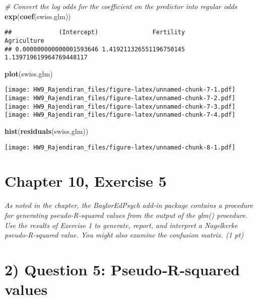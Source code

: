 \documentclass[]{article}
\newenvironment{Shaded}{\begin{snugshade}}{\end{snugshade}}
\newcommand{\CommentTok}[1]{\textcolor[rgb]{0.56,0.35,0.01}{\textit{#1}}}
\newcommand{\KeywordTok}[1]{\textcolor[rgb]{0.13,0.29,0.53}{\textbf{#1}}}
\newcommand{\NormalTok}[1]{#1}
\begin{document}
\begin{Shaded}
\begin{Highlighting}[]
\CommentTok{# Convert the log odds for the coefficient on the predictor into regular odds}
\KeywordTok{exp}\NormalTok{(}\KeywordTok{coef}\NormalTok{(swiss.glm))}
\end{Highlighting}
\end{Shaded}

\begin{verbatim}
##             (Intercept)               Fertility             Agriculture 
## 0.000000000000001593646 1.419211326551196750145 1.139719619964769448117
\end{verbatim}

\begin{Shaded}
\begin{Highlighting}[]
\KeywordTok{plot}\NormalTok{(swiss.glm)}
\end{Highlighting}
\end{Shaded}

\texttt{[image: HW9\_Rajendiran\_files/figure-latex/unnamed-chunk-7-1.pdf]}
\texttt{[image: HW9\_Rajendiran\_files/figure-latex/unnamed-chunk-7-2.pdf]}
\texttt{[image: HW9\_Rajendiran\_files/figure-latex/unnamed-chunk-7-3.pdf]}
\texttt{[image: HW9\_Rajendiran\_files/figure-latex/unnamed-chunk-7-4.pdf]}

\begin{Shaded}
\begin{Highlighting}[]
\KeywordTok{hist}\NormalTok{(}\KeywordTok{residuals}\NormalTok{(swiss.glm))}
\end{Highlighting}
\end{Shaded}

\texttt{[image: HW9\_Rajendiran\_files/figure-latex/unnamed-chunk-8-1.pdf]}

\hypertarget{chapter-10-exercise-5}{%
\section{Chapter 10, Exercise 5}\label{chapter-10-exercise-5}}

\emph{As noted in the chapter, the BaylorEdPsych add‐in package contains
a procedure for generating pseudo‐R‐squared values from the output of
the glm() procedure. Use the results of Exercise 1 to generate, report,
and interpret a Nagelkerke pseudo‐R‐squared value. You might also
examine the confusion matrix. (1 pt) }

\hypertarget{question-5-pseudorsquared-values}{%
\section{2) Question 5: Pseudo‐R‐squared
values}\label{question-5-pseudorsquared-values}}
\end{document}
